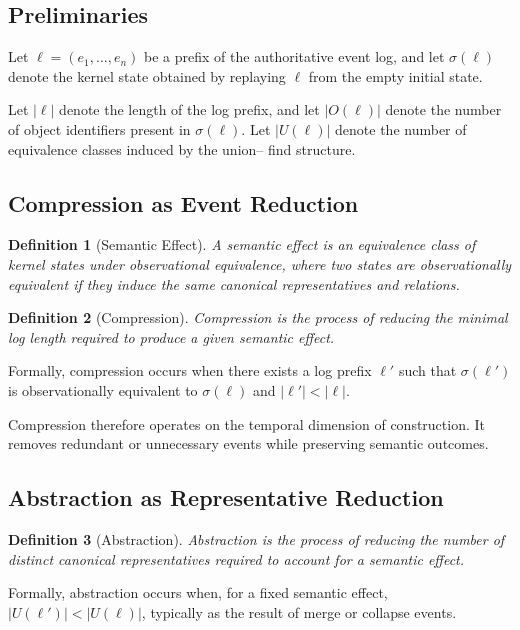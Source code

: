 \documentclass[11pt]{article}
\newtheorem{definition}{Definition}[section]
\begin{document}
\subsection{Preliminaries}

Let $\ell = (e_1, \ldots, e_n)$ be a prefix of the authoritative event log,
and let $\sigma(\ell)$ denote the kernel state obtained by replaying $\ell$
from the empty initial state.

Let $|\ell|$ denote the length of the log prefix, and let $|O(\ell)|$ denote
the number of object identifiers present in $\sigma(\ell)$. Let
$|U(\ell)|$ denote the number of equivalence classes induced by the union--
find structure.

\subsection{Compression as Event Reduction}

\begin{definition}[Semantic Effect]
A semantic effect is an equivalence class of kernel states under
observational equivalence, where two states are observationally equivalent
if they induce the same canonical representatives and relations.
\end{definition}

\begin{definition}[Compression]
Compression is the process of reducing the minimal log length required to
produce a given semantic effect.
\end{definition}

Formally, compression occurs when there exists a log prefix $\ell'$ such
that $\sigma(\ell')$ is observationally equivalent to $\sigma(\ell)$ and
$|\ell'| < |\ell|$.

Compression therefore operates on the temporal dimension of construction.
It removes redundant or unnecessary events while preserving semantic
outcomes.

\subsection{Abstraction as Representative Reduction}

\begin{definition}[Abstraction]
Abstraction is the process of reducing the number of distinct canonical
representatives required to account for a semantic effect.
\end{definition}

Formally, abstraction occurs when, for a fixed semantic effect,
$|U(\ell')| < |U(\ell)|$, typically as the result of merge or collapse
events.
\end{document}
